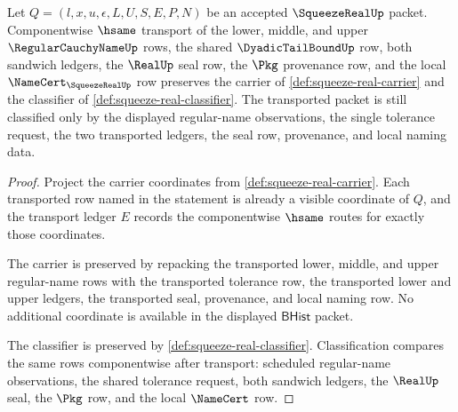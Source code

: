 \begin{theorem}
\label{thm:squeeze-real-transport-stability}
Let $Q=(l,x,u,\epsilon,L,U,S,E,P,N)$ be an accepted $\SqueezeRealUp$ packet. Componentwise $\hsame$ transport of the lower, middle, and upper $\RegularCauchyNameUp$ rows, the shared $\DyadicTailBoundUp$ row, both sandwich ledgers, the $\RealUp$ seal row, the $\Pkg$ provenance row, and the local $\NameCert_{\SqueezeRealUp}$ row preserves the carrier of \autoref{def:squeeze-real-carrier} and the classifier of \autoref{def:squeeze-real-classifier}. The transported packet is still classified only by the displayed regular-name observations, the single tolerance request, the two transported ledgers, the seal row, provenance, and local naming data.
\end{theorem}
\begin{proof}
Project the carrier coordinates from \autoref{def:squeeze-real-carrier}. Each transported row named in the statement is already a visible coordinate of $Q$, and the transport ledger $E$ records the componentwise $\hsame$ routes for exactly those coordinates.

The carrier is preserved by repacking the transported lower, middle, and upper regular-name rows with the transported tolerance row, the transported lower and upper ledgers, the transported seal, provenance, and local naming row. No additional coordinate is available in the displayed $\mathsf{BHist}$ packet.

The classifier is preserved by \autoref{def:squeeze-real-classifier}. Classification compares the same rows componentwise after transport: scheduled regular-name observations, the shared tolerance request, both sandwich ledgers, the $\RealUp$ seal, the $\Pkg$ row, and the local $\NameCert$ row.
\end{proof}

